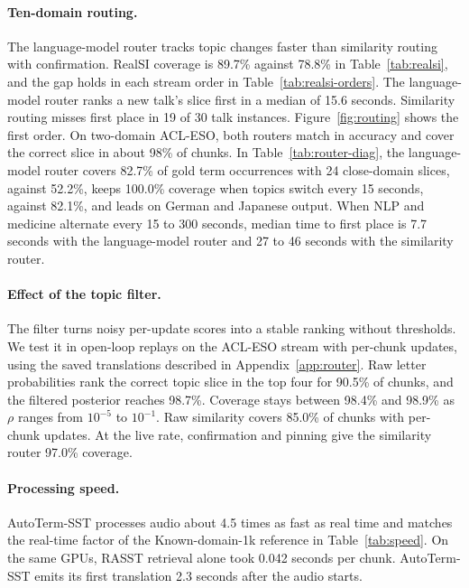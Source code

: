 \paragraph{Ten-domain routing.}
The language-model router tracks topic changes faster than similarity routing
with confirmation. RealSI coverage is 89.7\% against
78.8\% in Table~\ref{tab:realsi}, and the gap holds in each stream order in
Table~\ref{tab:realsi-orders}. The language-model router ranks a new talk's
slice first in a median of 15.6 seconds. Similarity routing misses first place
in 19 of 30 talk instances. Figure~\ref{fig:routing} shows the first order.
On two-domain ACL-ESO, both routers match in accuracy and cover the correct
slice in about 98\% of chunks. In Table~\ref{tab:router-diag}, the language-model router covers 82.7\% of gold
term occurrences with 24 close-domain slices, against 52.2\%, keeps 100.0\% coverage
when topics switch every 15 seconds, against 82.1\%, and leads on German and Japanese output.
When NLP and medicine alternate every 15 to 300 seconds, median time to first
place is 7.7 seconds with the language-model router and 27 to 46 seconds with
the similarity router.

\paragraph{Effect of the topic filter.}
The filter turns noisy per-update scores into a stable ranking without thresholds.
We test it in open-loop replays on the ACL-ESO stream with per-chunk updates, using
the saved translations described in Appendix~\ref{app:router}. Raw letter
probabilities rank the correct topic slice in the top four for 90.5\% of chunks,
and the filtered posterior reaches 98.7\%. Coverage stays between 98.4\% and
98.9\% as $\rho$ ranges from $10^{-5}$ to $10^{-1}$. Raw similarity covers
85.0\% of chunks with per-chunk updates. At the live rate, confirmation and
pinning give the similarity router 97.0\% coverage.

\paragraph{Processing speed.}
AutoTerm-SST processes audio about 4.5 times as fast as real time and matches
the real-time factor of the Known-domain-1k reference in Table~\ref{tab:speed}.
On the same GPUs, RASST retrieval alone took 0.042 seconds per chunk.
AutoTerm-SST emits its first translation 2.3 seconds after the audio starts.

